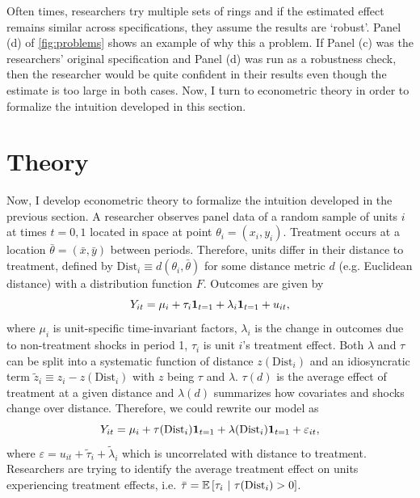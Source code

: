 \documentclass[10pt]{article}
\newcommand{\dist}{\text{Dist}}
\begin{document}
Often times, researchers try multiple sets of rings and if the estimated effect remains similar across specifications, they assume the results are `robust'. Panel (d) of \autoref{fig:problems} shows an example of why this a problem. If Panel (c) was the researchers' original specification and Panel (d) was run as a robustness check, then the researcher would be quite confident in their results even though the estimate is too large in both cases. Now, I turn to econometric theory in order to formalize the intuition developed in this section.



\section{Theory}

Now, I develop econometric theory to formalize the intuition developed in the previous section. A researcher observes panel data of a random sample of units $i$ at times $t = 0, 1$ located in space at point $\theta_i = (x_i, y_i)$. Treatment occurs at a location $\bar{\theta} = (\bar{x}, \bar{y})$ between periods. Therefore, units differ in their distance to treatment, defined by $\dist_i \equiv d(\theta_i, \bar{\theta})$ for some distance metric $d$ (e.g. Euclidean distance) with a distribution function $F$. Outcomes are given by 
\begin{equation}
    Y_{it} = \mu_i + \tau_i \mathbf{1}_{t = 1} + \lambda_i \mathbf{1}_{t=1} +u_{it},    
\end{equation}
where $\mu_i$ is unit-specific time-invariant factors, $\lambda_i$ is the change in outcomes due to non-treatment shocks in period 1, $\tau_i$ is unit $i$'s treatment effect. Both $\lambda$ and $\tau$ can be split into a systematic function of distance $z(\dist_i)$ and an idiosyncratic term $\tilde{z}_i \equiv z_i - z(\dist_i)$ with $z$ being $\tau$ and $\lambda$. $\tau(d)$ is the average effect of treatment at a given distance and $\lambda(d)$ summarizes how covariates and shocks change over distance.
Therefore, we could rewrite our model as 
\begin{equation}\label{eq:model}
    Y_{it} = \mu_i + \tau(\dist_i) \one_{t = 1} + \lambda(\dist_i) \one_{t=1} + \varepsilon_{it},   
\end{equation}
where $\varepsilon = u_{it} + \tilde{\tau}_i + \tilde{\lambda}_i$ which is uncorrelated with distance to treatment. Researchers are trying to identify the average treatment effect on units experiencing treatment effects, i.e. $\bar{\tau} = \condexpec{\tau_i}{\tau(\dist_i) > 0}$.
\end{document}
